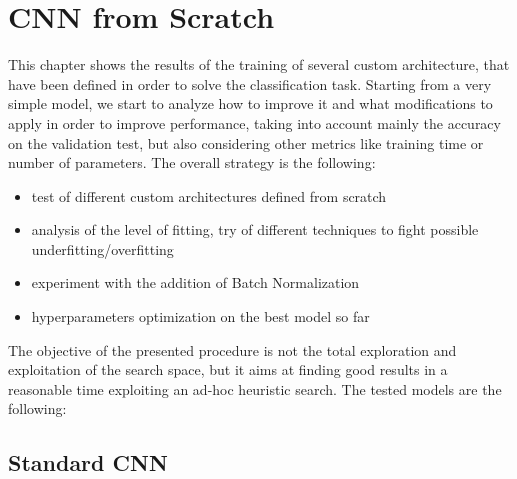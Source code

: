 \section{CNN from Scratch}
This chapter shows the results of the training of several custom architecture, that have been defined in order to solve the classification task.
Starting from a very simple model, we start to analyze how to improve it and what modifications to apply in order to improve performance, taking into account mainly the accuracy on the validation test, but also considering other metrics like training time or number of parameters.
The overall strategy is the following:
\begin{itemize}
\item test of different custom architectures defined from scratch
\item analysis of the level of fitting, try of different techniques to fight possible underfitting/overfitting
\item experiment with the addition of Batch Normalization
\item hyperparameters optimization on the best model so far
\end{itemize}

The objective of the presented procedure is not the total exploration and exploitation of the search space, but it aims at finding good results in a reasonable time exploiting an ad-hoc heuristic search.
The tested models are the following:

\subsection{Standard CNN}
